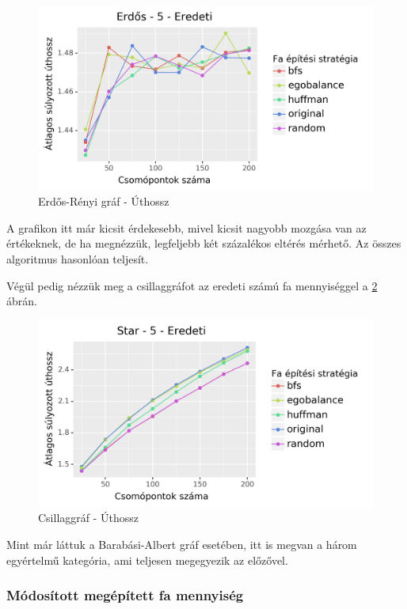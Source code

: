 \documentclass[12pt]{report}
\begin{document}
\begin{figure}[H]
	\begin{center}
		\includegraphics[width=0.9\linewidth]{pictures/erdos_len_e.png}
		\caption{Erdős-Rényi gráf - Úthossz}
		\label{erdos-len}
	\end{center}
\end{figure}

A grafikon itt már kicsit érdekesebb, mivel kicsit nagyobb mozgása van az értékeknek, de ha megnézzük, legfeljebb két százalékos eltérés mérhető.
Az összes algoritmus hasonlóan teljesít.   

Végül pedig nézzük meg a csillaggráfot az eredeti számú fa mennyiséggel a \ref{star-len} ábrán.

\begin{figure}[H]
	\begin{center}
		\includegraphics[width=0.9\linewidth]{pictures/star_len_e.png}
		\caption{Csillaggráf - Úthossz}
		\label{star-len}
	\end{center}
\end{figure}

Mint már láttuk a Barabási-Albert gráf esetében, itt is megvan a három egyértelmű kategória, ami teljesen megegyezik az előzővel.

\subsubsection{Módosított megépített fa mennyiség}
\end{document}
